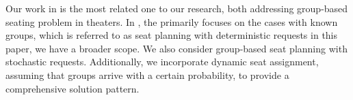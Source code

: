 % 



Our work in \cite{blom2022filling} is the most related one to our research, both addressing group-based seating problem in theaters. In \cite{blom2022filling}, the primarily focuses on the cases with known groups, which is referred to as seat planning with deterministic requests in this paper, we have a broader scope. We also consider group-based seat planning with stochastic requests. Additionally, we incorporate dynamic seat assignment, assuming that groups arrive with a certain probability, to provide a comprehensive solution pattern.






